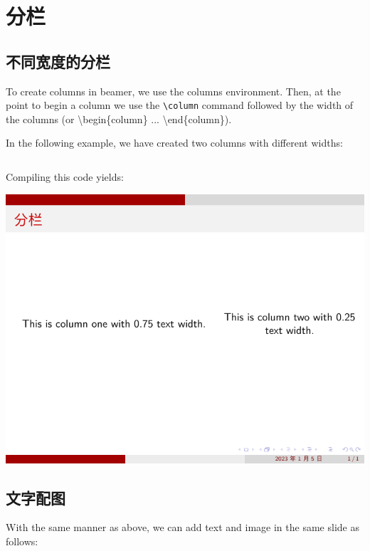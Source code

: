 \section{分栏}

\subsection{不同宽度的分栏}

To create columns in beamer, we use the columns environment. Then, at the point to begin a column we use the \verb|\column| command followed by the width of the columns (or {\ttfamily \textbackslash begin\{column\} ...  \textbackslash end\{column\}}).

In the following example, we have created two columns with different widths:

\inputminted[linenos=true]{latex}{examples/beamer/beamercolumn01.tex}

Compiling this code yields:

\includegraphics{examples/beamer/beamercolumn01.pdf}

\subsection{文字配图}

With the same manner as above, we can add text and image in the same slide as follows:

\inputminted[linenos=true]{latex}{examples/beamer/beamercolumn02.tex}

